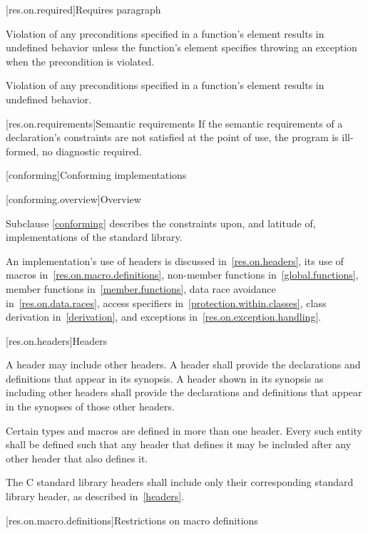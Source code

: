 [res.on.required]{Requires paragraph}

\pnum
{}%
Violation of any preconditions specified in a function's
\requires
element results in undefined behavior unless the function's
\throws
element specifies throwing an exception when the precondition is violated.

\pnum
Violation of any preconditions specified
in a function's \expects element
results in undefined behavior.

[res.on.requirements]{Semantic requirements}
\pnum
If the semantic requirements of a declaration's
constraints are not satisfied at the point of use,
the program is ill-formed, no diagnostic required.

[conforming]{Conforming implementations}

[conforming.overview]{Overview}

\pnum
Subclause \ref{conforming} describes the constraints upon, and latitude of, implementations of the \Cpp{} standard library.

\pnum
An implementation's use of headers is discussed in~\ref{res.on.headers}, its use
of macros in~\ref{res.on.macro.definitions}, non-member functions
in~\ref{global.functions}, member functions in~\ref{member.functions}, data race
avoidance in~\ref{res.on.data.races}, access specifiers
in~\ref{protection.within.classes}, class derivation in~\ref{derivation}, and
exceptions in~\ref{res.on.exception.handling}.

[res.on.headers]{Headers}

\pnum
A \Cpp{} header may include other \Cpp{} headers.
A \Cpp{} header shall provide the declarations and definitions that appear in its
synopsis. A \Cpp{} header shown in its synopsis as including other \Cpp{} headers
shall provide the declarations and definitions that appear in the synopses of
those other headers.

\pnum
Certain types and macros are defined in more than one header.
Every such entity shall be defined such that any header that defines it may be
included after any other header that also defines it.

\pnum
The C standard library headers
shall include only their corresponding \Cpp{} standard library header,
as described in~\ref{headers}.

[res.on.macro.definitions]{Restrictions on macro definitions}
%


